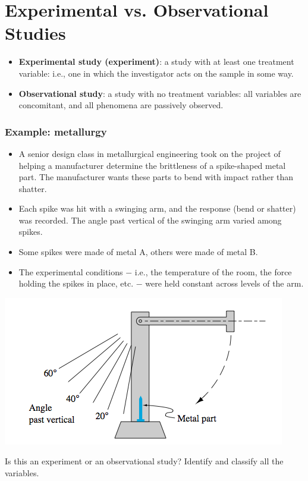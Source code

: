 \documentclass[handout]{beamer}\usepackage{graphicx, color}
\numberwithin{equation}{section}
\begin{document}
\section{Experimental vs. Observational Studies}

\begin{frame}
\begin{itemize}
\item {\bf Experimental study (experiment)}: a study with at least one treatment variable: i.e., one in which the investigator acts on the sample in some way.
\pause \item {\bf Observational study}: a study with no treatment variables: all variables are concomitant, and all phenomena are passively observed.
\end{itemize}
\end{frame}

\begin{frame}
\frametitle{Example: metallurgy} \scriptsize

\begin{itemize}
\item A senior design class in metallurgical engineering took on the project of helping a manufacturer determine the brittleness of a spike-shaped metal part. The manufacturer wants these parts to bend with impact rather than shatter. 
\pause \item Each spike was hit with a swinging arm, and the response (bend or shatter) was recorded. The angle past vertical of the swinging arm varied among spikes. 
\pause \item Some spikes were made of metal A, others were made of metal B.
\pause \item The experimental conditions $-$ i.e., the temperature of the room, the force holding the spikes in place, etc. $-$ were held constant across levels of the arm.
\end{itemize}

 

\begin{center}
 \includegraphics{../../fig/brittleschematic.png}
\end{center}

\pause Is this an experiment or an observational study? Identify and classify all the variables.

\end{frame}
\end{document}
